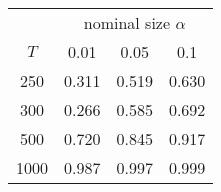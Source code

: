 % 
\begin{tabular}{cccc}
  \hline
  & \multicolumn{3}{c}{nominal size $\alpha$} \\
 $T$ & 0.01 & 0.05 & 0.1 \\
 \hline
250 & 0.311 & 0.519 & 0.630 \\ 
  300 & 0.266 & 0.585 & 0.692 \\ 
  500 & 0.720 & 0.845 & 0.917 \\ 
  1000 & 0.987 & 0.997 & 0.999 \\ 
   \hline
\end{tabular}
